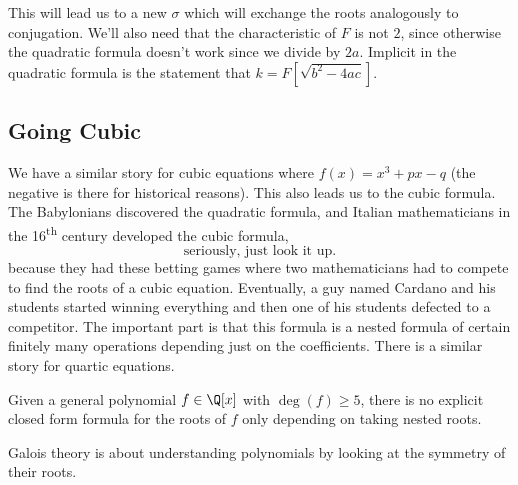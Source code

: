 This will lead us to a new $\sigma$ which will exchange the roots analogously to conjugation. We'll also need that the characteristic of $F$ is not $2$, since otherwise the quadratic formula doesn't work since we divide by $2a$. Implicit in the quadratic formula is the statement that $k = F[\sqrt{b^2-4ac}]$.

\subsection{Going Cubic}

We have a similar story for cubic equations where $f(x) = x^3 + px - q$ (the negative is there for historical reasons). This also leads us to the cubic formula. The Babylonians discovered the quadratic formula, and Italian mathematicians in the 16\textsuperscript{th} century developed the cubic formula,
\[ \text{seriously, just look it up.} \]
because they had these betting games where two mathematicians had to compete to find the roots of a cubic equation. Eventually, a guy named Cardano and his students started winning everything and then one of his students defected to a competitor. The important part is that this formula is a nested formula of certain finitely many operations depending just on the coefficients. There is a similar story for quartic equations.

\begin{theorem}
Given a general polynomial $f \in \Q[x]$ with $\deg(f) \geq 5$, there is no explicit closed form formula for the roots of $f$ only depending on taking nested roots.
\end{theorem}

Galois theory is about understanding polynomials by looking at the symmetry of their roots.